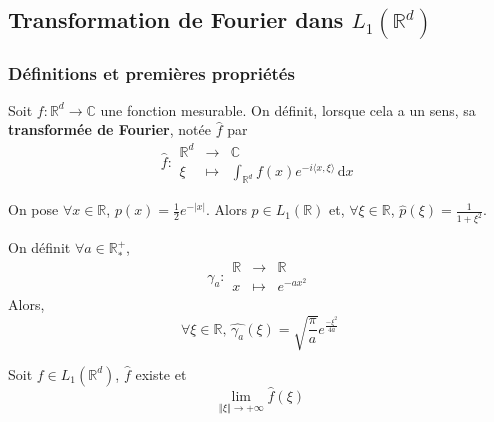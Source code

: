 




	\subsection{Transformation de Fourier dans \texorpdfstring{$L_1(\mathbb{R}^d)$}{L₁(Rᵈ)}}

	\subsubsection{Définitions et premières propriétés}
	
	
	\begin{definition}
		Soit $f : \mathbb{R}^d \rightarrow \mathbb{C}$ une fonction mesurable. On définit, lorsque cela a un sens, sa \textbf{transformée de Fourier}, notée $\widehat{f}$ par
		\[
		\widehat{f} :
		\begin{array}{ccc}
			\mathbb{R}^d &\rightarrow& \mathbb{C} \\
			\xi &\mapsto& \int_{\mathbb{R}^d} f(x) e^{-i\langle x, \xi \rangle} \, \mathrm{d}x
		\end{array}
		\]
	\end{definition}
	
	\begin{example}
		On pose $\forall x \in \mathbb{R}$, $p(x) = \frac{1}{2} e^{-|x|}$. Alors $p \in L_1(\mathbb{R})$ et, $\forall \xi \in \mathbb{R}$, $\widehat{p}(\xi) = \frac{1}{1+\xi^2}$.
	\end{example}
	
	
	\begin{example}
		\label{250-1}
		On définit $\forall a \in \mathbb{R}^+_*$,
		\[ \gamma_a :
		\begin{array}{ccc}
			\mathbb{R} &\rightarrow& \mathbb{R} \\
			x &\mapsto& e^{-ax^2}
		\end{array}
		\]
		Alors,
		\[ \forall \xi \in \mathbb{R}, \, \widehat{\gamma_a}(\xi) = \sqrt{\frac{\pi}{a}} e^{\frac{- \xi^2}{4a}} \]
	\end{example}
	
	
	\begin{lemma}
		Soit $f \in L_1(\mathbb{R}^d)$, $\widehat{f}$ existe et
		\[ \lim_{\Vert \xi \Vert \rightarrow +\infty} \widehat{f}(\xi) \]
	\end{lemma}
	
